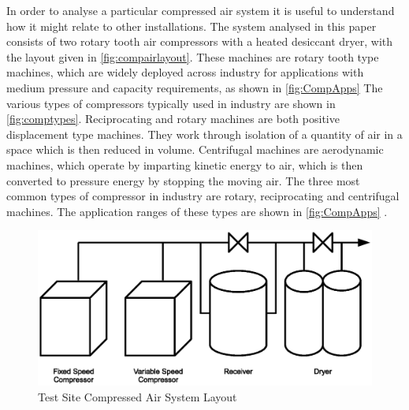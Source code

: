 
In order to analyse a particular compressed air system it is useful to understand how it might relate to other installations. The system analysed in this paper consists of two rotary tooth air compressors with a heated desiccant dryer, with the layout given in \autoref{fig:compairlayout}. These machines are rotary tooth type machines, which are widely deployed across industry for applications with medium pressure and capacity requirements, as shown in \autoref{fig:CompApps}\cite{SEAI2007} The various types of compressors typically used in industry are shown in \autoref{fig:comptypes}. Reciprocating and rotary machines are both positive displacement type machines. They work through isolation of a quantity of air in a space which is then reduced in volume. Centrifugal machines are aerodynamic machines, which operate by imparting kinetic energy to air, which is then converted to pressure energy by stopping the moving air. The three most common types of compressor in industry are rotary, reciprocating and centrifugal machines. The application ranges of these types are shown in \autoref{fig:CompApps} \cite{SEAI2007}.

\begin{figure}
\includegraphics[width = \textwidth]{./Images/PharmacyCompAir.eps}
\caption{Test Site Compressed Air System Layout}
\label{fig:compairlayout}
\end{figure}

